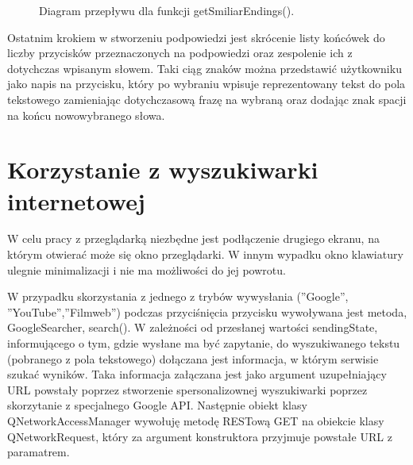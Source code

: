 \documentclass[twoside,a4paper]{book}
\begin{document}
				\begin{figure}[!h]
		\centering
		\caption{Diagram przepływu dla funkcji getSmiliarEndings().}
		\label{fig:similarEndingsFlow}
		\end{figure}
Ostatnim krokiem w stworzeniu podpowiedzi jest skrócenie listy końcówek do liczby przycisków przeznaczonych na podpowiedzi oraz zespolenie ich z dotychczas wpisanym słowem. Taki ciąg znaków można przedstawić użytkowniku jako napis na przycisku, który po wybraniu wpisuje reprezentowany tekst do pola tekstowego zamieniając dotychczasową frazę na wybraną oraz dodając znak spacji na końcu nowowybranego słowa.

\section{Korzystanie z wyszukiwarki internetowej}
W celu pracy z przeglądarką niezbędne jest podłączenie drugiego ekranu, na którym otwierać może się okno przeglądarki. W innym wypadku okno klawiatury ulegnie minimalizacji i nie ma możliwości do jej powrotu.

W przypadku skorzystania z jednego z trybów wywysłania (''Google'', ''YouTube'',''Filmweb'') podczas przyciśnięcia przycisku wywoływana jest metoda, GoogleSearcher, search(). W zależności od przesłanej wartości sendingState, informującego o tym, gdzie wysłane ma być zapytanie, do wyszukiwanego tekstu (pobranego z pola tekstowego) dołączana jest informacja, w którym serwisie szukać wyników. Taka informacja załączana jest jako argument uzupełniający URL powstały poprzez stworzenie spersonalizownej wyszukiwarki poprzez skorzytanie z specjalnego Google API. Następnie obiekt klasy QNetworkAccessManager wywołuję metodę RESTową GET na obiekcie klasy QNetworkRequest, który za argument konstruktora przyjmuje powstałe URL z paramatrem.
\end{document}
